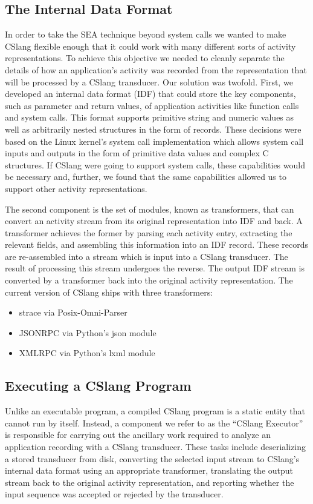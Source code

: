 \subsection{The Internal Data Format}

In order to take the SEA technique beyond system calls we wanted to make
CSlang flexible enough that it could work with many different sorts of
activity representations.
To achieve this objective we needed to cleanly separate the details of how
an application's activity was recorded from the representation that will be
processed by a CSlang transducer.
Our solution was twofold.  First, we developed an internal data format
(IDF) that
could store the key components, such as parameter and return values,
of application activities like function
calls and system calls.  This format supports primitive string and numeric
values as well as arbitrarily nested structures in the form of records.
These decisions were based on the Linux kernel's system call implementation
which allows system call inputs and outputs in the form of primitive data
values and complex C structures.
If CSlang were going to support system calls, these capabilities would be
necessary and, further, we found that the same capabilities allowed us to
support other activity representations.

The second component is the set of modules, known as transformers, that can
convert an activity stream from its original representation into IDF and
back.  A transformer achieves the former by parsing each activity entry,
extracting the relevant fields, and assembling this information into an IDF
record.  These records are re-assembled into a stream which is input into a
CSlang transducer.  The result of processing this stream undergoes the
reverse.  The output IDF stream is converted by a transformer back into the
original activity representation.  The current version of CSlang ships with
three transformers:
\begin{itemize}
\item{strace via Posix-Omni-Parser}
\item{JSONRPC via Python's json module}
\item{XMLRPC via Python's lxml module}
\end{itemize}


\subsection{Executing a CSlang Program}

Unlike an executable program, a compiled CSlang program is a static entity
that cannot run by itself.  Instead, a component we refer to as the
``CSlang Executor'' is responsible for carrying out the ancillary work
required to analyze an application recording with a CSlang transducer.
These tasks include deserializing a stored transducer from disk, converting
the selected input stream to CSlang's internal data format using an
appropriate transformer, translating the output stream back to the original
activity representation, and reporting whether the input sequence was
accepted or rejected by the transducer. 

